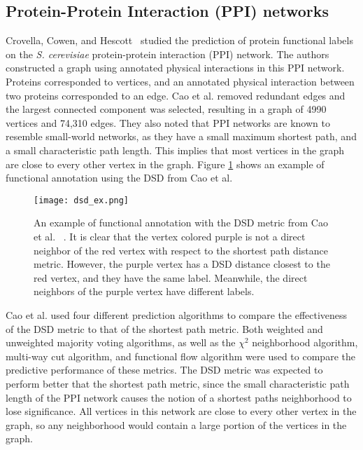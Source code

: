 \subsection{Protein-Protein Interaction (PPI) networks}
Crovella, Cowen, and Hescott~\cite{10.1371/journal.pone.0076339} studied the prediction of protein
functional labels on the \emph{S. cerevisiae} protein-protein interaction (PPI) network. The
authors constructed a graph using annotated physical interactions in this PPI network. Proteins
corresponded to vertices, and an annotated physical interaction between two proteins corresponded to
an edge. Cao et al. removed redundant edges and the largest connected component was selected,
resulting in a graph of 4990 vertices and 74,310 edges. They also noted that PPI networks are known
to resemble small-world networks, as they have a small maximum shortest path, and a small
characteristic path length. This implies that most vertices in the graph are close to every other
vertex in the graph. Figure \ref{fig:PPI_example} shows an example of functional annotation using
the DSD from Cao et al.

\begin{figure}[h] \centering \texttt{[image: dsd\_ex.png]}
\caption{An example of functional annotation with the DSD metric from Cao et al.
~\cite{10.1371/journal.pone.0076339}. It is clear that the vertex colored purple is not a direct
neighbor of the red vertex with respect to the shortest path distance metric. However, the purple
vertex has a DSD distance closest to the red vertex, and they have the same label. Meanwhile, the
direct neighbors of the purple vertex have different labels.}
\label{fig:PPI_example}
\end{figure}

Cao et al. used four different prediction algorithms to compare the effectiveness of the DSD metric
to that of the shortest path metric. Both weighted and unweighted majority voting algorithms, as
well as the $\chi^{2}$ neighborhood algorithm, multi-way cut algorithm, and functional flow
algorithm were used to compare the predictive performance of these metrics. The DSD metric was
expected to perform better that the shortest path metric, since the small characteristic path length
of the PPI network causes the notion of a shortest paths neighborhood to lose significance. All
vertices in this network are close to every other vertex in the graph, so any neighborhood would
contain a large portion of the vertices in the graph.

